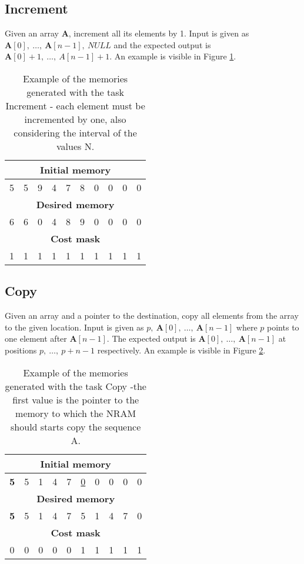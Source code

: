 \subsection{Increment}
Given an array $\textbf{A}$, increment all its elements by 1. Input is given as $\textbf{A}[0],\ \dots,\ \textbf{A}[n-1],\ \textit{NULL}$ and the expected output is $\textbf{A}[0] + 1,\ \dots,\ A[n-1] + 1$. An example is visible in Figure \ref{fig:increment-example}.
\begin{table}[h!]
	\centering
	\begin{tabular}{|c|c|c|c|c|c|c|c|c|c|}
		\hline
		\multicolumn{10}{|c|}{\textbf{Initial memory}} \\ \hline
		5 & 5 & 9 & 4 & 7 & 8 & 0 & 0 & 0 & 0 \\ \hline\hline\hline
		\multicolumn{10}{|c|}{\textbf{Desired memory}} \\ \hline
		6 & 6 & 0 & 4 & 8 & 9 & 0 & 0 & 0 & 0 \\ \hline\hline\hline
		\multicolumn{10}{|c|}{\textbf{Cost mask}} \\ \hline
		1 & 1 & 1 & 1 & 1 & 1 & 1 & 1 & 1 & 1 \\ \hline
	\end{tabular}
	\caption{Example of the memories generated with the task Increment - each element must be incremented by one, also considering the interval of the values N.}
	\label{fig:increment-example}
\end{table}
\FloatBarrier
\subsection{Copy}
Given an array and a pointer to the destination, copy all elements from the array to the given location. Input is given as $p,\ \textbf{A}[0],\ \dots,\ \textbf{A}[n-1]$ where $p$ points to one element after $\textbf{A}[n-1]$. The expected output is $\textbf{A}[0],\ \dots,\ \textbf{A}[n-1]$ at positions $p,\ \dots,\ p+n-1$ respectively. An example is visible in Figure \ref{fig:copy-example}.
\begin{table}[h!]
	\centering
	\begin{tabular}{|c|c|c|c|c|c|c|c|c|c|}
		\hline
		\multicolumn{10}{|c|}{\textbf{Initial memory}} \\ \hline
		\textbf{5} & 5 & 1 & 4 & 7 & \underline{0} & 0 & 0 & 0 & 0 \\ \hline\hline\hline
		\multicolumn{10}{|c|}{\textbf{Desired memory}} \\ \hline
		\textbf{5} & 5 & 1 & 4 & 7 & 5 & 1 & 4 & 7 & 0 \\ \hline\hline\hline
		\multicolumn{10}{|c|}{\textbf{Cost mask}} \\ \hline
		0 & 0 & 0 & 0 & 0 & 1 & 1 & 1 & 1 & 1 \\ \hline
	\end{tabular}
	\caption{Example of the memories generated with the task Copy -the first value is the pointer to the memory to which the NRAM should starts copy the sequence A. }
	\label{fig:copy-example}
\end{table}
\FloatBarrier
